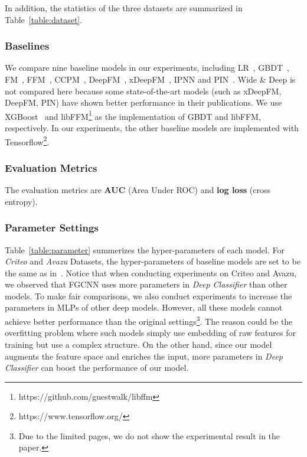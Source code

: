 In addition, the statistics of the three datasets are summarized in Table~\ref{table:dataset}.

\subsubsection{Baselines}

We compare nine baseline models in our experiments, including LR~\cite{lr}, GBDT~\cite{gbdt}, FM~\cite{fm}, FFM~\cite{ffm}, CCPM~\cite{ccpm}, DeepFM~\cite{deepfm}, xDeepFM~\cite{xdeepfm}, IPNN and PIN~\cite{pin}. Wide \& Deep is not compared here because some state-of-the-art models (such as xDeepFM, DeepFM, PIN) have shown better performance in their publications. We use XGBoost~\cite{gbdt} and libFFM\footnote{https://github.com/guestwalk/libffm} as the implementation of GBDT and libFFM, respectively.  In our experiments, the other baseline models are implemented with Tensorflow\footnote{https://www.tensorflow.org/}.

\subsubsection{Evaluation Metrics} The evaluation metrics are \textbf{AUC} (Area Under ROC) and \textbf{log loss} (cross entropy).

\subsubsection{Parameter Settings}




Table~\ref{table:parameter} summerizes the hyper-parameters of each model.
For \textit{Criteo} and \textit{Avazu} Datasets, the hyper-parameters of baseline models are set to be the same as in~\cite{pin}. Notice that when conducting experiments on Criteo and Avazu, we observed that FGCNN uses more parameters in \emph{Deep Classifier} than other models. To make fair comparisons, we also conduct experiments to increase the parameters in MLPs of other deep models. However, all these models cannot achieve better performance than the original settings\footnote{Due to the limited pages, we do not show the experimental result in the paper.}. The reason could be the overfitting problem where such models simply use embedding of raw features for training but use a complex structure. On the other hand, since our model augments the feature space and enriches the input, more parameters in \emph{Deep Classifier} can boost the performance of our model.

